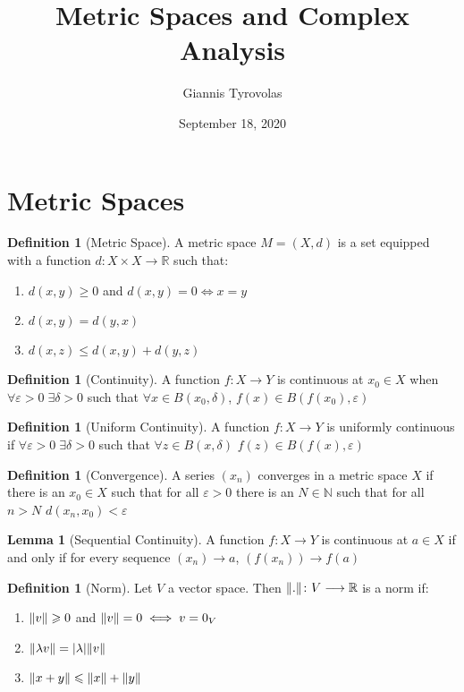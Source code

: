 \documentclass[11pt,a4paper, titlepage]{article}
\title{Metric Spaces and Complex Analysis}
\author{Giannis Tyrovolas}
\date{September 18, 2020}
\DeclarePairedDelimiter\abs{\lvert}{\rvert}
\DeclarePairedDelimiter\norm{\lVert}{\rVert}
\theoremstyle{definition}
\newtheorem{definition}[theorem]{Definition}
\newtheorem{lemma}[theorem]{Lemma}
\begin{document}
\maketitle

\section{Metric Spaces}
\begin{definition}[Metric Space]
A metric space $M = (X, d)$ is a set equipped with a function $d \colon X \times X \longrightarrow \mathbb{R}$ such that:

\begin{enumerate}
	\item $d(x,y) \geqslant 0 $ and $d(x,y) = 0 \iff x = y$
	\item $d(x,y) = d(y,x)$
	\item $d(x,z) \leqslant d(x,y) + d(y,z)$
\end{enumerate}
\end{definition}

\begin{definition}[Continuity]
A function $f \colon X \longrightarrow Y$ is continuous at $x_0 \in X$ when $\forall \varepsilon > 0 \; \exists \delta > 0$ such that $\forall x \in B(x_0, \delta)$, $f(x) \in B(f(x_0), \varepsilon)$
\end{definition} 

\begin{definition}[Uniform Continuity]
A function $f \colon X \longrightarrow Y$ is uniformly continuous if $\forall \varepsilon >0 \; \exists \delta > 0$ such that $\forall z \in B(x,\delta)$ $f(z) \in B(f(x), \varepsilon)$
\end{definition}

\begin{definition}[Convergence]
A series $(x_n)$ converges in a metric space $X$ if there is an $x_0 \in X$ such that for all $\varepsilon > 0$ there is an $N \in \mathbb{N}$ such that for all $ n > N$ $d(x_n, x_0) < \varepsilon$
\end{definition}

\begin{lemma}[Sequential Continuity]

A function $f \colon X \longrightarrow Y$ is continuous at $a \in X$ if and only if for every sequence $(x_n) \to a$, $(f(x_n)) \to f(a)$

\end{lemma}

\begin{definition}[Norm]
Let $V$ a vector space. Then $\norm{.} \colon V \longrightarrow \mathbb{R}$ is a norm if:
\begin{enumerate}
	\item $\norm{v} \geqslant 0$ and $\norm{v} = 0 \iff v = 0_V $
	\item $\norm{ \lambda v } = \abs{\lambda} \norm{v}$
	\item $\norm{x + y} \leqslant \norm{x} + \norm{y}$
\end{enumerate}
\end{definition}
\end{document}

